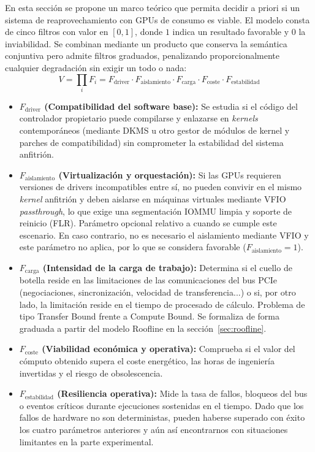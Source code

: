 \documentclass[a4paper,11pt]{article}
\begin{document}
En esta sección se propone un marco teórico que permita decidir a priori si un sistema de reaprovechamiento con GPUs de consumo es
viable.
El modelo consta de cinco filtros con valor en $[0,1]$, donde $1$ indica un resultado favorable y $0$ la inviabilidad. Se combinan
mediante un producto que conserva la semántica conjuntiva pero admite filtros graduados, penalizando proporcionalmente cualquier
degradación sin exigir un todo o nada:
\begin{equation*}
V = \prod_{i} F_i = F_{\text{driver}} \cdot F_{\text{aislamiento}} \cdot F_{\text{carga}} \cdot F_{\text{coste}} \cdot F_{\text{estabilidad}}
\end{equation*}
\begin{itemize}[leftmargin=*,labelsep=0.5em,itemsep=0.8ex]
    \item \textbf{$F_{\text{driver}}$ (Compatibilidad del software base):} Se estudia si el código del controlador propietario puede compilarse y enlazarse en \textit{kernels} contemporáneos (mediante
    DKMS u otro gestor de módulos de kernel y parches de compatibilidad) sin comprometer la estabilidad del sistema
    anfitrión. 
    \item \textbf{$F_{\text{aislamiento}}$ (Virtualización y orquestación):} Si las GPUs requieren versiones de drivers
    incompatibles entre sí, no pueden convivir en el mismo \textit{kernel} anfitrión y deben aislarse en máquinas
    virtuales mediante VFIO \textit{passthrough}, lo que exige una segmentación IOMMU limpia y soporte de reinicio (FLR).
    Parámetro opcional relativo a cuando se cumple este escenario. En caso contrario, 
    no es necesario el aislamiento mediante VFIO y este parámetro no aplica, por lo que se considera favorable ($F_{\text{aislamiento}} = 1$).
    \item \textbf{$F_{\text{carga}}$ (Intensidad de la carga de trabajo):} Determina si el cuello de botella reside en las
    limitaciones de las comunicaciones del bus PCIe (negociaciones, sincronización, velocidad de transferencia...) o si, por otro
    lado, la limitación reside en el tiempo de procesado de cálculo. Problema de tipo Transfer Bound frente a Compute Bound.
    Se formaliza de forma graduada a partir del modelo Roofline en la sección~\ref{sec:roofline}.
    \item \textbf{$F_{\text{coste}}$ (Viabilidad económica y operativa):} Comprueba si el valor del cómputo obtenido supera el coste
    energético, las horas de ingeniería invertidas y el riesgo de obsolescencia.
    \item \textbf{$F_{\text{estabilidad}}$ (Resiliencia operativa):} Mide la tasa de fallos, bloqueos del bus o eventos críticos
    durante ejecuciones sostenidas en el tiempo. Dado que los fallos de hardware no son deterministas, pueden haberse superado con éxito
    los cuatro parámetros anteriores y aún así encontrarnos con situaciones limitantes en la parte experimental.
\end{itemize}
\end{document}

